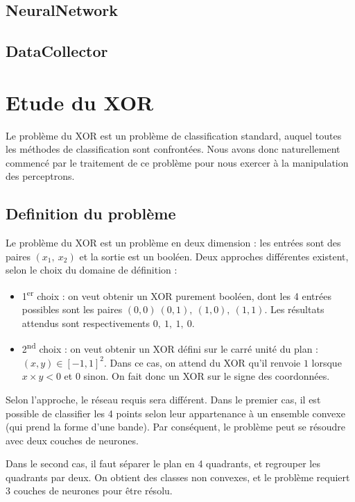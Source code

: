 \subsection{NeuralNetwork}

\subsection{DataCollector}

\section{Etude du XOR}

Le problème du XOR est un problème de classification standard, auquel toutes les méthodes de classification sont confrontées. Nous avons donc naturellement commencé par le traitement de ce problème pour nous exercer à la manipulation des perceptrons.

\subsection{Definition du problème}

Le problème du XOR est un problème en deux dimension : les entrées sont des paires $(x_1,\ x_2)$ et la sortie est un booléen. Deux approches différentes existent, selon le choix du domaine de définition : 

\begin{itemize}
  \item 1\textsuperscript{er} choix : on veut obtenir un XOR purement booléen, dont les 4 entrées possibles sont les paires $(0,0)\ (0,1),\ (1,0),\ (1,1)$. Les résultats attendus sont respectivements $0,\ 1,\ 1,\ 0$.
  \item 2\textsuperscript{nd} choix : on veut obtenir un XOR défini sur le carré unité du plan : ${(x,y) \in [-1,1]^2}$. Dans ce cas, on attend du XOR qu'il renvoie $1$ lorsque $x \times y < 0$ et $0$ sinon. On fait donc un XOR sur le signe des coordonnées.
\end{itemize}

Selon l'approche, le réseau requis sera différent. Dans le premier cas, il est possible de classifier les 4 points selon leur appartenance à un ensemble convexe (qui prend la forme d'une bande). Par conséquent, le problème peut se résoudre avec deux couches de neurones.

Dans le second cas, il faut séparer le plan en 4 quadrants, et regrouper les quadrants par deux. On obtient des classes non convexes, et le problème requiert 3 couches de neurones pour être résolu.

